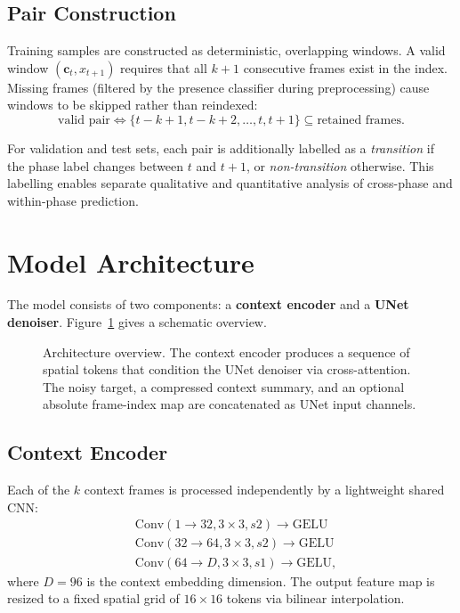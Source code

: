 \documentclass[12pt, a4paper, twoside]{report}
\begin{document}
\subsection{Pair Construction}
\label{ssec:pair_construction}

Training samples are constructed as deterministic, overlapping windows.
A valid window $(\mathbf{c}_t, x_{t+1})$ requires that all $k+1$ consecutive
frames exist in the index.
Missing frames (filtered by the presence classifier during preprocessing)
cause windows to be skipped rather than reindexed:
\[
  \text{valid pair} \iff
    \{t{-}k{+}1, t{-}k{+}2, \ldots, t, t{+}1\} \subseteq \text{retained frames}.
\]

For validation and test sets, each pair is additionally labelled as a
\emph{transition} if the phase label changes between $t$ and $t+1$, or
\emph{non-transition} otherwise.
This labelling enables separate qualitative and quantitative analysis of
cross-phase and within-phase prediction.

\section{Model Architecture}
\label{sec:architecture}

The model consists of two components: a \textbf{context encoder} and a
\textbf{UNet denoiser}.
Figure~\ref{fig:architecture} gives a schematic overview.

\begin{figure}[H]
\centering
\caption{Architecture overview. The context encoder produces a sequence of
         spatial tokens that condition the UNet denoiser via cross-attention.
         The noisy target, a compressed context summary, and an optional
         absolute frame-index map are concatenated as UNet input channels.}
\label{fig:architecture}
\end{figure}

\subsection{Context Encoder}
\label{ssec:ctx_encoder}

Each of the $k$ context frames is processed independently by a lightweight
shared CNN:
\begin{align*}
  &\text{Conv}(1 \to 32, 3{\times}3, s2) \to \text{GELU} \\
  &\text{Conv}(32 \to 64, 3{\times}3, s2) \to \text{GELU} \\
  &\text{Conv}(64 \to D, 3{\times}3, s1) \to \text{GELU},
\end{align*}
where $D = 96$ is the context embedding dimension.
The output feature map is resized to a fixed spatial grid of
$16 \times 16$ tokens via bilinear interpolation.
\end{document}
